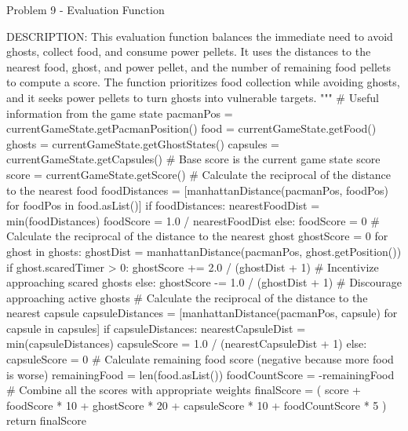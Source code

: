 \begin{problem}{Problem 9 - Evaluation Function}
\begin{highlight}[Solution]
\begin{code}[Python]
            DESCRIPTION: This evaluation function balances the immediate need to avoid
            ghosts, collect food, and consume power pellets. It uses the distances to
            the nearest food, ghost, and power pellet, and the number of remaining food
            pellets to compute a score. The function prioritizes food collection while
            avoiding ghosts, and it seeks power pellets to turn ghosts into vulnerable targets.
        """
        # Useful information from the game state
        pacmanPos = currentGameState.getPacmanPosition()
        food = currentGameState.getFood()
        ghosts = currentGameState.getGhostStates()
        capsules = currentGameState.getCapsules()
        # Base score is the current game state score
        score = currentGameState.getScore()
        # Calculate the reciprocal of the distance to the nearest food
        foodDistances = [manhattanDistance(pacmanPos, foodPos) for foodPos in food.asList()]
        if foodDistances:
            nearestFoodDist = min(foodDistances)
            foodScore = 1.0 / nearestFoodDist
        else:
            foodScore = 0
        # Calculate the reciprocal of the distance to the nearest ghost
        ghostScore = 0
        for ghost in ghosts:
            ghostDist = manhattanDistance(pacmanPos, ghost.getPosition())
            if ghost.scaredTimer > 0:
                ghostScore += 2.0 / (ghostDist + 1)  # Incentivize approaching scared ghosts
            else:
                ghostScore -= 1.0 / (ghostDist + 1)  # Discourage approaching active ghosts
        # Calculate the reciprocal of the distance to the nearest capsule
        capsuleDistances = [manhattanDistance(pacmanPos, capsule) for capsule in capsules]
        if capsuleDistances:
            nearestCapsuleDist = min(capsuleDistances)
            capsuleScore = 1.0 / (nearestCapsuleDist + 1)
        else:
            capsuleScore = 0
        # Calculate remaining food score (negative because more food is worse)
        remainingFood = len(food.asList())
        foodCountScore = -remainingFood
        # Combine all the scores with appropriate weights
        finalScore = (
            score +               
            foodScore * 10 +      
            ghostScore * 20 +     
            capsuleScore * 10 +   
            foodCountScore * 5
        )
        return finalScore
    \end{code}
    \end{highlight}
\end{problem}